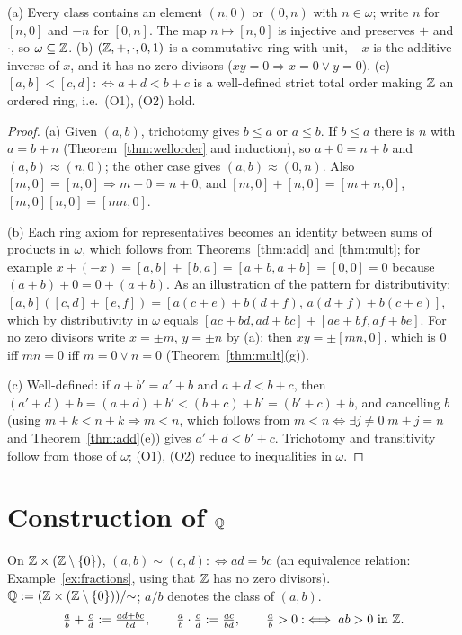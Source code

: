 \begin{theorem}[Structure of $\Z$]\label{thm:Z}
	(a) Every class contains an element $(n,0)$ or $(0,n)$ with $n\in\omega$; write $n$ for $[n,0]$ and $-n$ for $[0,n]$. The map $n\mapsto[n,0]$ is injective and preserves $+$ and $\cdot$, so $\omega\subseteq\mathbb{Z}$.
	(b) $(\mathbb{Z},+,\cdot,0,1)$ is a commutative ring with unit, $-x$ is the additive inverse of $x$, and it has no zero divisors ($xy=0\Rightarrow x=0\vee y=0$).
	(c) $[a,b]<[c,d]:\iff a+d<b+c$ is a well-defined strict total order making $\Z$ an ordered ring, i.e.\ (O1), (O2) hold.
\end{theorem}
\begin{proof}
	(a) Given $(a,b)$, trichotomy gives $b\le a$ or $a\le b$. If $b\le a$ there is $n$ with $a=b+n$ (Theorem~\ref{thm:wellorder} and induction), so $a+0=n+b$ and $(a,b)\approx(n,0)$; the other case gives $(a,b)\approx(0,n)$. Also $[m,0]=[n,0]\Rightarrow m+0=n+0$, and $[m,0]+[n,0]=[m+n,0]$, $[m,0][n,0]=[mn,0]$.
	
	(b) Each ring axiom for representatives becomes an identity between sums of products in $\omega$, which follows from Theorems~\ref{thm:add} and \ref{thm:mult}; for example $x+(-x)=[a,b]+[b,a]=[a+b,a+b]=[0,0]=0$ because $(a+b)+0=0+(a+b)$. As an illustration of the pattern for distributivity: $[a,b]([c,d]+[e,f])=[a(c+e)+b(d+f),\,a(d+f)+b(c+e)]$, which by distributivity in $\omega$ equals $[ac+bd,ad+bc]+[ae+bf,af+be]$. For no zero divisors write $x=\pm m$, $y=\pm n$ by (a); then $xy=\pm[mn,0]$, which is $0$ iff $mn=0$ iff $m=0\vee n=0$ (Theorem~\ref{thm:mult}(g)).
	
	(c) Well-defined: if $a+b'=a'+b$ and $a+d<b+c$, then $(a'+d)+b=(a+d)+b'<(b+c)+b'=(b'+c)+b$, and cancelling $b$ (using $m+k<n+k\Rightarrow m<n$, which follows from $m<n\iff\exists j\ne0\;m+j=n$ and Theorem~\ref{thm:add}(e)) gives $a'+d<b'+c$. Trichotomy and transitivity follow from those of $\omega$; (O1), (O2) reduce to inequalities in $\omega$.
\end{proof}

\section{Construction of $\mathbb{Q}$}

\begin{definition}[Rationals]
	On $\mathbb{Z}\times(\mathbb{Z}\setminus\{0\})$, $(a,b)\sim(c,d):\iff ad=bc$ (an equivalence relation: Example~\ref{ex:fractions}, using that $\Z$ has no zero divisors). $\mathbb{Q}:=(\mathbb{Z}\times(\mathbb{Z}\setminus\{0\}))/{\sim}$; $a/b$ denotes the class of $(a,b)$.
	\[
	\tfrac ab+\tfrac cd:=\tfrac{ad+bc}{bd},\qquad\tfrac ab\cdot\tfrac cd:=\tfrac{ac}{bd},\qquad\tfrac ab>0:\iff ab>0\text{ in }\mathbb{Z}.
	\]
\end{definition}

